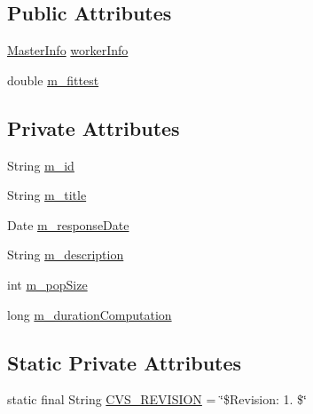 \subsection*{Public Attributes}
\begin{DoxyCompactItemize}
\item 
\hyperlink{classorg_1_1jgap_1_1distr_1_1_master_info}{Master\-Info} \hyperlink{classorg_1_1jgap_1_1distr_1_1grid_1_1wan_1_1_result_information_a489addd9b351bb90aac229de8d3d3784}{worker\-Info}
\item 
double \hyperlink{classorg_1_1jgap_1_1distr_1_1grid_1_1wan_1_1_result_information_a8361530958669f508d2c782eb2f189a3}{m\-\_\-fittest}
\end{DoxyCompactItemize}
\subsection*{Private Attributes}
\begin{DoxyCompactItemize}
\item 
String \hyperlink{classorg_1_1jgap_1_1distr_1_1grid_1_1wan_1_1_result_information_a10d361eb8e7c6833893ade5b0f442fad}{m\-\_\-id}
\item 
String \hyperlink{classorg_1_1jgap_1_1distr_1_1grid_1_1wan_1_1_result_information_a55655c6d928baf5ba9366c716befbf02}{m\-\_\-title}
\item 
Date \hyperlink{classorg_1_1jgap_1_1distr_1_1grid_1_1wan_1_1_result_information_a2462d1cc67b53f6fb91870115857cc6b}{m\-\_\-response\-Date}
\item 
String \hyperlink{classorg_1_1jgap_1_1distr_1_1grid_1_1wan_1_1_result_information_a56eb2e03a5a32d44480b46f271f30736}{m\-\_\-description}
\item 
int \hyperlink{classorg_1_1jgap_1_1distr_1_1grid_1_1wan_1_1_result_information_a2395c0e5db2fa94dd14c308ba339fc12}{m\-\_\-pop\-Size}
\item 
long \hyperlink{classorg_1_1jgap_1_1distr_1_1grid_1_1wan_1_1_result_information_a4fcbf55ae05f8b8ca4aebcea9736002b}{m\-\_\-duration\-Computation}
\end{DoxyCompactItemize}
\subsection*{Static Private Attributes}
\begin{DoxyCompactItemize}
\item 
static final String \hyperlink{classorg_1_1jgap_1_1distr_1_1grid_1_1wan_1_1_result_information_a031eee2edaf744b6284634fa744a740e}{C\-V\-S\-\_\-\-R\-E\-V\-I\-S\-I\-O\-N} = \char`\"{}\$Revision\-: 1. \$\char`\"{}
\end{DoxyCompactItemize}


